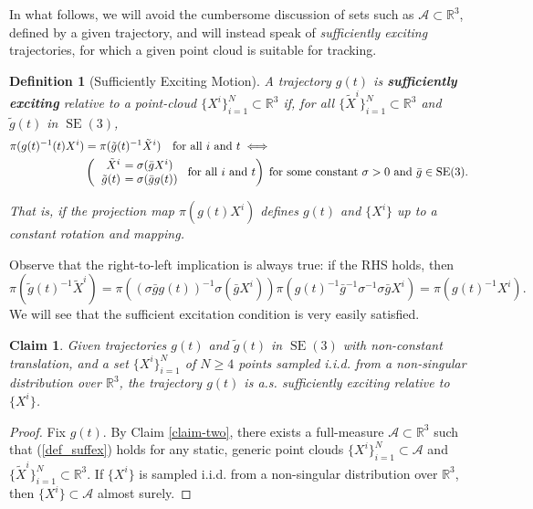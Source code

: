 \documentclass[]{article}
\newtheorem{defn}{Definition}
\newtheorem{claim}{Claim}
\def\gw{\tilde{g}}
\def\Xw{\tilde{X}}
\def\inv{^{-1}}
\def\RR{\mathbb{R}}
\def\subs{\subset}
\def\SE{\operatorname{SE}}
\def\Aa{\mathcal{A}}
\begin{document}
In what follows, we will avoid the cumbersome discussion of sets such as $\Aa\subs\RR^3$,
defined by a given trajectory,
and will instead speak of \emph{sufficiently exciting} trajectories, 
for which a given point cloud is suitable for tracking.
\begin{defn}[Sufficiently Exciting Motion]
A trajectory $g(t)$ is {\bf{sufficiently exciting}} relative to a point-\break cloud $\{X^i\}_{i=1}^N\subs\RR^3$ if,
for all $\{\Xw^i\}_{i=1}^N\subs\RR^3$ and $\gw(t)$ in $\SE(3)$,
\begin{align}
\pi(g(t)\inv(t)X^i) &= \pi(\gw(t)\inv \Xw^i) 
\quad\text{for all $i$ and $t$}\label{def_suffex}
\iff
\\
&
\left(
\begin{tabular}{>{$}r<{$}>{$\!\!\!\!\!}l<{$}}
\Xw^i &= \sigma(\bar g X^i)\\
\gw(t) &= \sigma(\bar g g(t))
\end{tabular}
\;\text{for all $i$ and $t$}
\right)
\;\text{for some constant $\sigma>0$ and $\bar g\in\SE(3)$.}\notag
\end{align}

That is, if the projection map $\pi(g(t)X^i)$ defines $g(t)$ and $\{X^i\}$ up to a constant rotation and mapping.
\end{defn}
\noindent
Observe that the right-to-left implication is always true:  if the RHS holds, then
$$\pi(\gw(t)\inv\Xw^i) = \pi((\sigma \bar g g(t))\inv \sigma(\bar g X^i)) 
\pi(g(t)\inv \bar g\inv \sigma\inv \sigma \bar g X^i )
= \pi(g(t)\inv X^i).$$
We will see that the sufficient excitation condition is very easily satisfied.
\begin{claim}
Given trajectories $g(t)$ and $\gw(t)$ in $\SE(3)$ with non-constant translation, 
and a set $\{X^i\}_{i=1}^N$ of $N\geq 4$ points sampled i.i.d. from a non-singular distribution over $\RR^3$,
the trajectory $g(t)$ is a.s. sufficiently exciting relative to $\{X^i\}$.
\end{claim}
\begin{proof}
Fix $g(t)$. By Claim \ref{claim-two},
there exists a full-measure $\Aa\subs\RR^3$ such that (\ref{def_suffex}) holds for any 
static, generic point clouds
$\{X^i\}_{i=1}^N\subs\Aa$ and 
$\{\Xw^i\}_{i=1}^N\subs\RR^3$.
If $\{X^i\}$ is sampled i.i.d. from a non-singular distribution over $\RR^3$, 
then $\{X^i\}\subs\Aa$ almost surely.
\end{proof}
\end{document}
